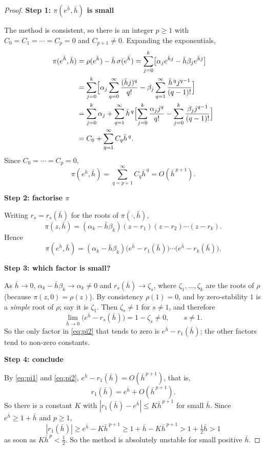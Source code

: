\documentclass[11pt,a4paper]{article}
\numberwithin{equation}{section}
\theoremstyle{spacedplain}
\theoremstyle{spaceddefinition}
\theoremstyle{spacedremark}
\newcommand{\step}[1]{\par\addvspace{0.6em}\noindent\textbf{#1}\par\nobreak}
\newcommand{\hb}{\bar h}
\begin{document}
\begin{proof}\leavevmode
\step{Step 1: \(\pi(e^{\hb},\hb)\) is small}
The method is
consistent, so there is an integer \(p\ge1\) with
\(C_0=C_1=\cdots=C_p=0\) and \(C_{p+1}\ne0\).  Expanding the
exponentials,
\begin{align*}
  \pi(e^{\hb},\hb)
  &=\rho(e^{\hb})-\hb\,\sigma(e^{\hb})
   =\sum_{j=0}^k\bigl[\alpha_je^{\hb j}-\hb\beta_je^{\hb j}\bigr]\\
  &=\sum_{j=0}^k\Bigl[\alpha_j\sum_{q=0}^\infty\frac{(\hb j)^q}{q!}
    -\beta_j\sum_{q=1}^\infty\frac{\hb^{\,q}j^{q-1}}{(q-1)!}\Bigr]\\
  &=\sum_{j=0}^k\alpha_j
    +\sum_{q=1}^\infty\hb^{\,q}
     \Bigl[\sum_{j=0}^k\frac{\alpha_jj^q}{q!}
          -\sum_{j=0}^k\frac{\beta_jj^{q-1}}{(q-1)!}\Bigr]\\
  &=C_0+\sum_{q=1}^\infty C_q\hb^{\,q}.
\end{align*}
Since \(C_0=\cdots=C_p=0\),
\begin{equation}\label{eq:pi1}
  \pi(e^{\hb},\hb)=\sum_{q=p+1}^\infty C_q\hb^{\,q}=O(\hb^{\,p+1}).
\end{equation}

\step{Step 2: factorise \(\pi\)}
Writing \(r_s=r_s(\hb)\) for the
roots of \(\pi(\cdot,\hb)\),
\[
  \pi(z,\hb)=(\alpha_k-\hb\beta_k)(z-r_1)(z-r_2)\cdots(z-r_k).
\]
Hence
\begin{equation}\label{eq:pi2}
  \pi(e^{\hb},\hb)
  =(\alpha_k-\hb\beta_k)
   \bigl(e^{\hb}-r_1(\hb)\bigr)\cdots\bigl(e^{\hb}-r_k(\hb)\bigr).
\end{equation}

\step{Step 3: which factor is small?}
As \(\hb\to0\),
\(\alpha_k-\hb\beta_k\to\alpha_k\ne0\) and \(r_s(\hb)\to\zeta_s\),
where \(\zeta_1,\dots,\zeta_k\) are the roots of \(\rho\) (because
\(\pi(z,0)=\rho(z)\)).  By consistency \(\rho(1)=0\), and by
zero-stability \(1\) is a \emph{simple} root of \(\rho\); say it is
\(\zeta_1\).  Then \(\zeta_s\ne1\) for \(s\ne1\), and therefore
\[
  \lim_{\hb\to0}\bigl(e^{\hb}-r_s(\hb)\bigr)=1-\zeta_s\ne0,
  \qquad s\ne1.
\]
So the only factor in \eqref{eq:pi2} that tends to zero is
\(e^{\hb}-r_1(\hb)\); the other factors tend to non-zero constants.

\step{Step 4: conclude}
By \eqref{eq:pi1} and \eqref{eq:pi2},
\(e^{\hb}-r_1(\hb)=O(\hb^{\,p+1})\), that is,
\[
  r_1(\hb)=e^{\hb}+O(\hb^{\,p+1}).
\]
So there is a constant \(K\) with
\(|r_1(\hb)-e^{\hb}|\le K\hb^{\,p+1}\) for small \(\hb\).  Since
\(e^{\hb}\ge1+\hb\) and \(p\ge1\),
\[
  |r_1(\hb)|\ge e^{\hb}-K\hb^{\,p+1}\ge1+\hb-K\hb^{\,p+1}>1+\tfrac12\hb>1
\]
as soon as \(K\hb^{\,p}<\frac12\).  So the method is absolutely unstable
for small positive \(\hb\).
\end{proof}
\end{document}

